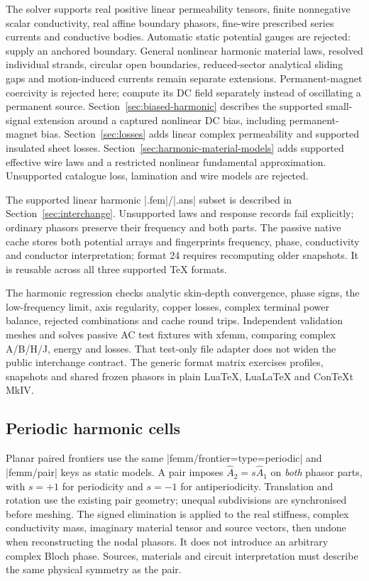 The solver supports real positive linear permeability tensors, finite
nonnegative scalar conductivity, real affine boundary phasors, fine-wire
prescribed series currents and conductive bodies. Automatic static potential
gauges are rejected: supply an anchored boundary. General nonlinear harmonic material
laws, resolved individual strands, circular open boundaries,
reduced-sector analytical sliding gaps and motion-induced currents
remain separate extensions. Permanent-magnet coercivity is rejected here;
compute its DC field separately instead of oscillating a permanent source.
Section~\ref{sec:biased-harmonic} describes the supported small-signal extension
around a captured nonlinear DC bias, including permanent-magnet bias.
Section~\ref{sec:losses} adds linear complex permeability and supported insulated
sheet losses. Section~\ref{sec:harmonic-material-models} adds supported effective
wire laws and a restricted nonlinear fundamental approximation. Unsupported
catalogue loss, lamination and wire models are rejected.

The supported linear harmonic |.fem|/|.ans| subset is described in
Section~\ref{sec:interchange}. Unsupported laws and response records fail
explicitly; ordinary phasors preserve their frequency and both parts. The passive
native cache stores both potential arrays and fingerprints frequency, phase,
conductivity and conductor interpretation; format 24 requires recomputing older
snapshots. It is reusable across all three supported TeX formats.

The harmonic regression checks analytic skin-depth convergence,
phase signs, the low-frequency limit, axis regularity, copper losses, complex
terminal power balance, rejected combinations and cache round trips.
Independent validation meshes and solves passive
AC test fixtures with xfemm, comparing complex A/B/H/J, energy and losses.
That test-only file adapter does not widen the public interchange contract.
The generic format matrix exercises profiles, snapshots and shared frozen
phasors in plain LuaTeX, LuaLaTeX and ConTeXt MkIV.


\subsection{Periodic harmonic cells}
\label{sec:harmonic-periodicity}
Planar paired frontiers use the same |femm/frontier={type=periodic}| and
|femm/pair| keys as static models. A pair imposes
$\widehat A_2=s\widehat A_1$ on \emph{both} phasor parts, with $s=+1$ for
periodicity and $s=-1$ for antiperi\-odicity. Translation and rotation use the
existing pair geometry; unequal subdivisions are synchronised before meshing.
The signed elimination is applied to the real stiffness, complex conductivity
mass, imaginary material tensor and source vectors, then undone when
reconstructing the nodal phasors. It does not introduce an arbitrary complex
Bloch phase. Sources, materials and circuit interpretation must describe the
same physical symmetry as the pair.

